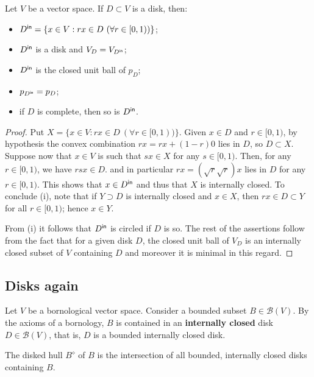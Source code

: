 \begin{lemma} Let $V$ be a vector space. If $D \subset V$ is a disk, then: 
\begin{itemize}
\item[(i)] $D^\intc = \{x \in V : rx \in D  \ (\forall r \in [0,1))\}$;
\item[(ii)] $D^{\mathsf{in}}$ is a disk and $V_D = V_{D^{\mathsf{in}}}$; 
\item[(iii)] $D^{\mathsf{in}}$ is the closed unit ball of $p_D$;
\item[(iv)] $p_{D^{\mathsf{in}}} = p_D$;
\item[(v)] if $D$ is complete, then so is $D^{\mathsf{in}}$.
\end{itemize}
\end{lemma}
\begin{proof} Put $X = \{x \in V : rx \in D  \ (\forall r \in [0,1))\}$.
Given $x \in D$ and $r \in [0,1)$, by hypothesis the convex combination $rx = rx+(1-r)0$ lies in $D$, so $D \subset X$. 
Suppose now that $x \in V$ is such that $sx \in X$
for any $s \in [0,1)$. Then, for any $r \in [0,1)$, we have $rsx \in D$.
and in particular $rx = (\sqrt{r}\sqrt{r}) x$ lies in $D$ for any $r \in [0,1)$. 
This shows that $x \in D^{\mathsf{in}}$ and thus that $X$ is internally closed. To conclude 
(i), note that if $Y \supset D$ is internally closed and $x \in X$, then $rx \in D \subset Y$ for all $r \in [0,1)$; hence $x \in Y$.

From (i) it follows that $D^{\mathsf{in}}$ is circled if $D$ is so.
The rest of the assertions follow from the fact that for a given disk $D$, the closed unit ball of $V_D$ is an internally closed subset of $V$ containing $D$ and moreover it is minimal in this regard.
\end{proof}


\subsection{Disks again}

Let \(V\) be a bornological vector space. Consider a bounded subset \(B \in \mathcal{B}(V)\). By the axioms of a bornology, \(B\) is contained in an \textbf{internally closed} disk \(D \in \mathcal{B}(V)\), that is, \(D\) is a bounded internally closed disk. 

\begin{definition}
    The disked hull \(B^\diamond\) of \(B\) is the intersection of all bounded, internally closed disks containing \(B\).
\end{definition}

